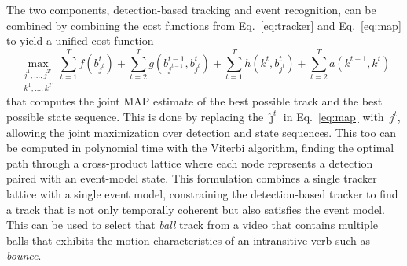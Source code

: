 The two components, detection-based tracking and event recognition, can be
combined by combining the cost functions from Eq.~\ref{eq:tracker} and
Eq.~\ref{eq:map} to yield a unified cost function
%
\begin{equation*}
  \max_{\substack{j^1,\ldots,j^T\\k^1,\ldots,k^T}}
  \displaystyle \sum_{t=1}^T f(b^t_{j^t})+\sum_{t=2}^T g(b^{t-1}_{j^{t-1}},b^t_{j^t})
  \displaystyle {}+\sum_{t=1}^Th(k^t,b^t_{j^t})+\displaystyle\sum_{t=2}^Ta(k^{t-1},k^t)
\end{equation*}
%
that computes the joint MAP estimate of the best possible track and the best
possible state sequence.
%
This is done by replacing the $\hat{\jmath}^t$ in Eq.~\ref{eq:map} with~$j^t$,
allowing the joint maximization over detection and state sequences.
%
This too can be computed in polynomial time with the Viterbi algorithm, finding
the optimal path through a cross-product lattice where each node represents a
detection paired with an event-model state.
%
This formulation combines a single tracker lattice with a single event model,
constraining the detection-based tracker to find a track that is not only
temporally coherent but also satisfies the event model.
%
This can be used to select that \emph{ball} track from a video that contains
multiple balls that exhibits the motion characteristics of an intransitive verb
such as \emph{bounce}.

